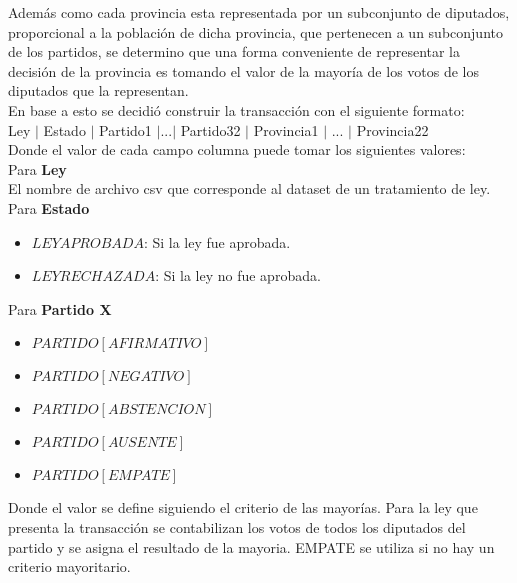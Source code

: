 \documentclass{endm}
\begin{document}
Además como cada provincia esta representada por un subconjunto de diputados, proporcional a la población de dicha provincia, que pertenecen a un subconjunto de los partidos, se determino que una forma conveniente de representar la decisión de la provincia es tomando el valor de la mayoría de los votos de los diputados que la representan. \\

En base a esto se decidió construir la transacción con el siguiente formato: \\

Ley $|$ Estado $|$ Partido1 $|$...$|$ Partido32 $|$ Provincia1 $|$ ... $|$ Provincia22 \\

Donde el valor de cada campo columna puede tomar los siguientes valores: \\

Para \textbf{Ley} \\

El nombre de archivo csv que corresponde al dataset de un tratamiento de ley. \\

Para \textbf{Estado} \\

\begin{itemize}
\item $LEY APROBADA$: Si la ley fue aprobada.
\item $LEY RECHAZADA$: Si la ley no fue aprobada. \\
\end{itemize}

 Para \textbf{Partido X} \\

\begin{itemize}
\item $PARTIDO [AFIRMATIVO]$
\item $PARTIDO [NEGATIVO]$
\item $PARTIDO [ABSTENCION]$
\item $PARTIDO [AUSENTE]$ 
\item $PARTIDO [EMPATE]$ \\
\end{itemize}

Donde el valor se define siguiendo el criterio de las mayorías. Para la ley que presenta la transacción se contabilizan los votos de todos los diputados del partido
y se asigna el resultado de la mayoria. EMPATE se utiliza si no hay un criterio mayoritario. \\
\end{document}
